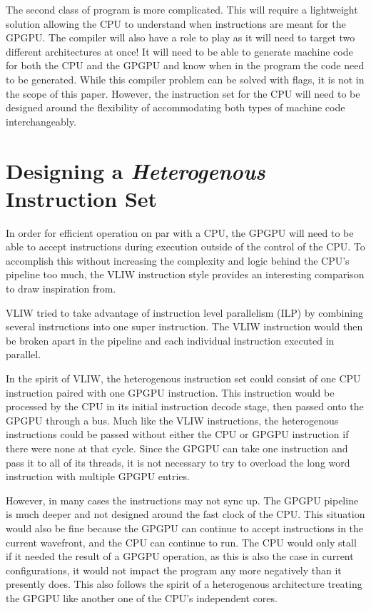 The second class of program is more complicated. This will require a lightweight solution allowing the CPU to understand when instructions are meant for the GPGPU. The compiler will also have a role to play as it will need to target two different architectures at once! It will need to be able to generate machine code for both the CPU and the GPGPU and know when in the program the code need to be generated. While this compiler problem can be solved with flags, it is not in the scope of this paper. However, the instruction set for the CPU will need to be designed around the flexibility of accommodating both types of machine code interchangeably. 


\section*{Designing a \textit{Heterogenous} Instruction Set}

In order for efficient operation on par with a CPU, the GPGPU will need to be able to accept instructions during execution outside of the control of the CPU. To accomplish this without increasing the complexity and logic behind the CPU's pipeline too much, the VLIW instruction style provides an interesting comparison to draw inspiration from. 

VLIW tried to take advantage of instruction level parallelism (ILP) by combining several instructions into one super instruction. The VLIW instruction would then be broken apart in the pipeline and each individual instruction executed in parallel. 

In the spirit of VLIW, the heterogenous instruction set could consist of one CPU instruction paired with one GPGPU instruction. This instruction would be processed by the CPU in its initial instruction decode stage, then passed onto the GPGPU through a bus. Much like the VLIW instructions, the heterogenous instructions could be passed without either the CPU or GPGPU instruction if there were none at that cycle. Since the GPGPU can take one instruction and pass it to all of its threads, it is not necessary to try to overload the long word instruction with multiple GPGPU entries.

However, in many cases the instructions may not sync up. The GPGPU pipeline is much deeper and not designed around the fast clock of the CPU. This situation would also be fine because the GPGPU can continue to accept instructions in the current wavefront, and the CPU can continue to run. The CPU would only stall if it needed the result of a GPGPU operation, as this is also the case in current configurations, it would not impact the program any more negatively than it presently does. This also follows the spirit of a heterogenous architecture treating the GPGPU like another one of the CPU's independent cores. 

